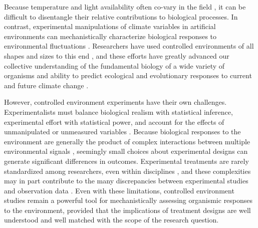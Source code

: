\documentclass[11pt]{article}
\begin{document}
\noindent Because temperature and light availability often co-vary in the field \citep[for example, in most temperate ecosystems, daylength and temperature both increase as the season progresses,][]{Rosenberg1974}, it can be difficult to disentangle their relative contributions to biological processes. In contrast, experimental manipulations of climate variables in artificial environments can mechanistically characterize biological responses to environmental fluctuations \citep{Ettinger:2020aa,Primack2015}. Researchers have used controlled environments of all shapes and sizes to this end \citep{Downs:1980us}, and these efforts have greatly advanced our collective understanding of the fundamental biology of a wide variety of organisms and ability to predict ecological and evolutionary responses to current and future climate change \citep{Stewart:2013wz}.

However, controlled environment experiments have their own challenges. Experimentalists must balance biological realism with statistical inference, experimental effort with statistical power, and account for the effects of unmanipulated or unmeasured variables \citep{schneiner2001}. Because biological responses to the environment are generally the product of complex interactions between multiple environmental signals \citep{Casal:2002vz}, seemingly small choices about experimental designs can generate significant differences in outcomes. Experimental treatments are rarely standardized among researchers, even within disciplines \citep{limitingcues}, and these complexities may in part contribute to the many discrepancies between experimental studies and observation data \citep{Poorter:2016aa}. Even with these limitations, controlled environment studies remain a powerful tool for mechanistically assessing organismic responses to the environment, provided that the implications of treatment designs are well understood and well matched with the scope of the research question. 
\end{document}
